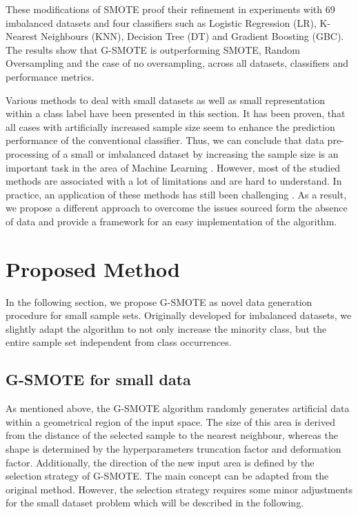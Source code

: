 \documentclass[parskip=full]{scrartcl}
\begin{document}
These modifications of SMOTE proof their refinement in experiments with 69 imbalanced datasets and four classifiers such as Logistic Regression (LR), K-Nearest Neighbours (KNN), Decision Tree (DT) and Gradient Boosting (GBC). The results show that G-SMOTE is outperforming SMOTE, Random Oversampling and the case of no oversampling, across all datasets, classifiers and performance metrics.    

Various methods to deal with small datasets as well as small representation 
within a class label have been presented in this section. It has been proven, 
that all cases with artificially increased sample size seem to enhance the 
prediction performance of the conventional classifier. Thus, we can conclude 
that data pre-processing of a small or imbalanced dataset by increasing the 
sample size is an important task in the area of Machine Learning 
\cite{Ruparel.2013}. However, most of the studied methods are associated with a 
lot of limitations and are hard to understand. In practice, an application of 
these methods has still been challenging \cite{Sezer.2014}. As a result, we 
propose a different approach to overcome the issues sourced form the absence of 
data and provide a framework for an easy implementation of the algorithm.

\section{Proposed Method}

In the following section, we propose G-SMOTE as novel data generation procedure for small sample sets. Originally developed for imbalanced datasets, we slightly adapt the algorithm to not only increase the minority class, but the entire sample set independent from class occurrences. 

\subsection{G-SMOTE for small data}

As mentioned above, the G-SMOTE algorithm randomly generates artificial data within a geometrical region of the input space. The size of this area is derived from the distance of the selected sample to the nearest neighbour, whereas the shape is determined by the hyperparameters truncation factor and deformation factor. Additionally, the direction of the new input area is defined by the selection strategy of G-SMOTE. The main concept can be adapted from the original method. However, the selection strategy requires some minor adjustments for the small dataset problem which will be described in the following.
\end{document}
